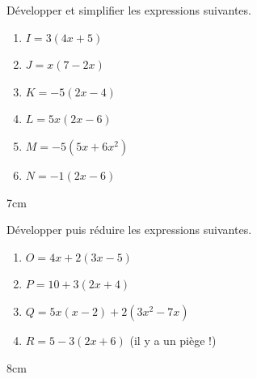 \documentclass[a4paper]{book}
\begin{document}
    \begin{exercice}
        Développer et simplifier les expressions suivantes.
        
        \begin{minipage}{0.45\linewidth}
            \begin{enumerate}
                \item $I = 3(4x + 5)$
                \item $J = x(7 - 2x)$
                \item $K = -5(2x - 4)$
            \end{enumerate}
        \end{minipage}
        \hfill \vline \hfill
        \begin{minipage}{0.45\linewidth}
            \begin{enumerate}
                \setcounter{enumi}{3}
                \item $L = 5x(2x-6)$
                \item $M = -5(5x+6x^2)$
                \item $N = -1(2x-6)$
            \end{enumerate}
        \end{minipage}

        \begin{ZoneReponse}{7cm}
        \end{ZoneReponse}
    \end{exercice}
    
    \newpage %
    
    \begin{exercice}
        Développer puis réduire les expressions suivantes.
        \begin{enumerate}
            \item $O = 4x + 2(3x - 5)$
            \item $P = 10 + 3(2x + 4)$
            \item $Q = 5x(x - 2) + 2(3x^2 - 7x)$
            \item $R = 5-3(2x+6)$ (il y a un piège !)
        \end{enumerate}
        \begin{ZoneReponse}{8cm}
        \end{ZoneReponse}
    \end{exercice}
    
\end{document}
